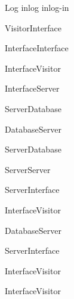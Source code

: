 \begin{toexclude}
\begin{sdfig}{Log in}{log in}{log-in}
  \begin{umlcall}[op={Log in}]{Visitor}{Interface}
    \begin{umlcall}[op={Validate}]{Interface}{Interface}
      \begin{umlfragment}[type=alt, label=valid]
        \begin{umlcall}[type=return,op={Loading}]{Interface}{Visitor}
          \begin{umlcall}[op={Log in}]{Interface}{Server}
            \begin{umlcall}[op={Has user}]{Server}{Database}
              \begin{umlfragment}[type=alt, label=true]
                \begin{umlcall}[type=return,op={Yes}]{Database}{Server}
                  \begin{umlcall}[op={Create OTP}]{Server}{Database}
                    \begin{umlcall}[op={Send email}]{Server}{Server}
                      \begin{umlcall}[type=return,op={Ok}]{Server}{Interface}
                        \begin{umlcall}[type=return,op={Ok}]{Interface}{Visitor}
                        \end{umlcall}
                      \end{umlcall}
                    \end{umlcall}
                  \end{umlcall}
                \end{umlcall}
                \umlfpart[else]
                \begin{umlcall}[type=return,op={No}]{Database}{Server}
                  \begin{umlcall}[type=return,op={Error}]{Server}{Interface}
                    \begin{umlcall}[type=return,op={Error}]{Interface}{Visitor}
                    \end{umlcall}
                  \end{umlcall}
                \end{umlcall}
              \end{umlfragment}
            \end{umlcall}
          \end{umlcall}
        \end{umlcall}
        \umlfpart[else]
        \begin{umlcall}[type=return,op={Error}]{Interface}{Visitor}
        \end{umlcall}
      \end{umlfragment}
    \end{umlcall}
  \end{umlcall}
\end{sdfig}



\end{toexclude}
